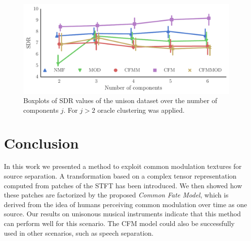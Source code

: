 \begin{figure}[ht!]
\centering
		\includegraphics[width=0.90\columnwidth]{Chapters/commonfate/figures/iterations.pdf}
\caption{Boxplots of SDR values of the unison dataset over the number of components $j$. For $j>2$ oracle clustering was applied.}
\label{fig:iterations}
\end{figure}

\section{Conclusion}
\label{sec:conclusion}

In this work we presented a method to exploit common modulation textures for source separation. A transformation based on a complex tensor representation computed from patches of the STFT has been introduced. We then showed how these patches are factorized by the proposed \emph{Common Fate Model}, which is derived from the idea of humans perceiving common modulation over time as one source. Our results on unisonous musical instruments indicate that this method can perform well for this scenario. The CFM model could also be successfully used in other scenarios, such as speech separation.

% 

